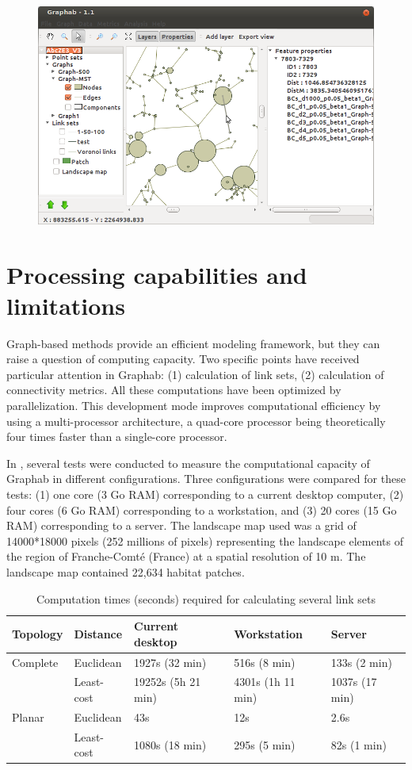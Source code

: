 \documentclass{article}
\begin{document}
\begin{figure}[H]
	\includegraphics[scale=0.5]{img/manual-en_img18.png}
\end{figure}


\section{Processing capabilities and limitations}
\label{limit}
Graph-based methods provide an efficient modeling framework, but they can raise a question of computing capacity. Two specific points have received particular attention in Graphab: (1) calculation of link sets, (2) calculation of connectivity metrics. All these computations have been optimized by parallelization. This development mode improves computational efficiency by using a multi-processor architecture, a
quad-core processor being theoretically four times faster than a single-core processor.

In \cite{2012_graphab_EMS}, several tests were conducted to measure the computational capacity of Graphab in different configurations. Three configurations were compared for these
tests: (1) one core (3 Go RAM) corresponding to a current desktop computer, (2) four cores (6 Go RAM) corresponding to a workstation, and (3) 20 cores (15 Go RAM) corresponding to a server. The landscape map used was a grid of 14000*18000 pixels (252 millions of pixels) representing the landscape elements of the region of Franche-Comté (France) at a spatial resolution of 10 m. The landscape map contained 22,634 habitat patches. 

\begin{table}[H]
\begin{tabular}{|l|l|l|l|l|}
\hline
Topology & Distance & Current desktop & Workstation  & Server\\
\hline
Complete
 & Euclidean & 1927s (32 min) & 516s (8 min) & 133s (2 min)\\
\hhline{~----}
 & Least-cost & 19252s (5h 21 min) & 4301s (1h 11 min) & 1037s (17 min)\\
\hline
Planar
 & Euclidean & 43s & 12s & 2.6s\\
\hhline{~----}
 & Least-cost & 1080s (18 min) & 295s (5 min) & 82s (1 min)\\
\hline
\end{tabular}
\caption{Computation times (seconds) required for calculating several link sets}
\label{perf}
\end{table}
\end{document}
